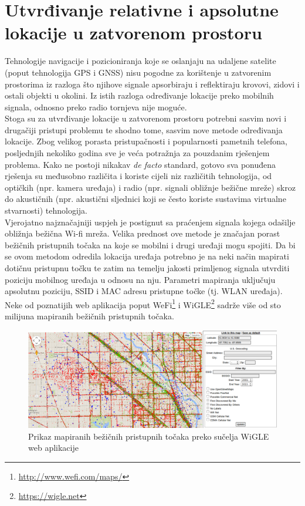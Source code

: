 \chapter{Utvrđivanje relativne i apsolutne lokacije u zatvorenom prostoru}
\label{chap:procjenaLokacije}

Tehnologije navigacije i pozicioniranja koje se oslanjaju na udaljene satelite (poput tehnologija GPS i GNSS) nisu pogodne za korištenje u zatvorenim prostorima iz razloga što njihove signale apsorbiraju i reflektiraju krovovi, zidovi i ostali objekti u okolini. 
Iz istih razloga određivanje lokacije preko mobilnih signala, odnosno preko radio tornjeva nije moguće. 
\\
Stoga su za utvrđivanje lokacije u zatvorenom prostoru potrebni sasvim novi i drugačiji pristupi problemu te shodno tome, sasvim nove metode određivanja lokacije. 
Zbog velikog porasta pristupačnosti i popularnosti pametnih telefona, posljednjih nekoliko godina sve je veća potražnja za pouzdanim rješenjem problema. 
Kako ne postoji nikakav \textit{de facto} standard, gotovo sva ponuđena rješenja su međusobno različita i koriste cijeli niz različitih tehnologija, od optičkih (npr. kamera uređaja) i radio (npr. signali obližnje bežične mreže) skroz do akustičnih (npr. akustični sljednici koji se često koriste sustavima virtualne stvarnosti) tehnologija.
\\

Vjerojatno najznačajniji uspjeh je postignut sa praćenjem signala kojega odašilje obližnja bežična Wi-fi mreža. 
Velika prednost ove metode je značajan porast bežičnih pristupnih točaka na koje se mobilni i drugi uređaji mogu spojiti. 
Da bi se ovom metodom odredila lokacija uređaja potrebno je na neki način mapirati dotičnu pristupnu točku te zatim na temelju jakosti primljenog signala utvrditi poziciju mobilnog uređaja u odnosu na nju. 
Parametri mapiranja uključuju apsolutnu poziciju, SSID  i MAC adresu  pristupne točke (tj. WLAN uređaja). 
Neke od poznatijih web aplikacija poput WeFi\footnote{\url{http://www.wefi.com/maps/}} i WiGLE\footnote{\url{https://wigle.net}} sadrže više od sto milijuna mapiranih bežičnih pristupnih točaka. 
\\

\begin{figure}
    \centering
    \includegraphics[scale=0.305]{pictures/WiGLE}
    \caption{Prikaz mapiranih bežičnih pristupnih točaka preko sučelja WiGLE web aplikacije}    
\end{figure}

